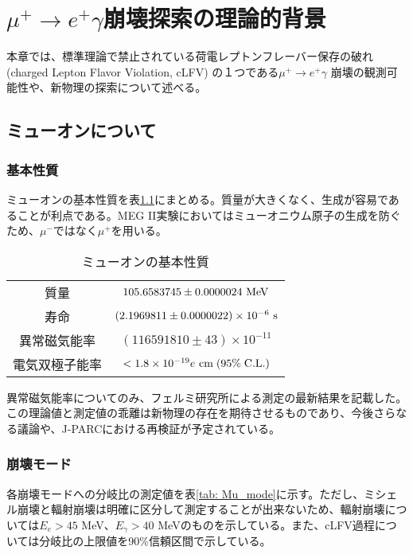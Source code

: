 \documentclass[Yonemoto_master.tex]{subfiles}
\begin{document}
\chapter{$\mu^+ \to e^+ \gamma$崩壊探索の理論的背景}
本章では、標準理論で禁止されている荷電レプトンフレーバー保存の破れ (charged Lepton Flavor Violation, cLFV) の１つである$\mu^+ \to e^+ \gamma$ 崩壊の観測可能性や、新物理の探索について述べる。

\section{ミューオンについて}
\subsection{基本性質}
ミューオンの基本性質を表\ref{tab: Mu_prop}にまとめる。質量が大きくなく、生成が容易であることが利点である。MEG II実験においてはミューオニウム原子の生成を防ぐため、$\mu^-$ではなく$\mu^+$を用いる。

\begin{table}[h]
 \centering
 \caption{ミューオンの基本性質 \cite{muon}}
 \label{tab: Mu_prop}
  \begin{tabular}{cc}
   \hline
   質量 & $105.6583745 \pm 0.0000024 \ {\rm MeV}$ \\
   寿命 & $(2.1969811 \pm 0.0000022) \times 10^{-6} \ {\rm s}$ \\ 
   異常磁気能率 & $(116591810 \pm 43) \times 10^{-11} $ \cite{fermi_g2}\\
   電気双極子能率 & $< 1.8 \times 10^{-19} e \ {\rm cm} \; (95\% \; {\rm C.L.})$ \\
   \hline
  \end{tabular}
\end{table}

異常磁気能率についてのみ、フェルミ研究所による測定の最新結果を記載した。この理論値と測定値の乖離は新物理の存在を期待させるものであり、今後さらなる議論や、J-PARCにおける再検証が予定されている\cite{jparc_g2}。

\subsection{崩壊モード}
各崩壊モードへの分岐比の測定値を表\ref{tab: Mu_mode}に示す。ただし、ミシェル崩壊と輻射崩壊は明確に区分して測定することが出来ないため、輻射崩壊については$E_e > 45$ MeV、$E_\gamma > 40$ MeVのものを示している。また、cLFV過程については分岐比の上限値を90\%信頼区間で示している。
\end{document}
